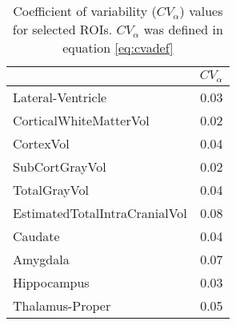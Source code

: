 \begin{table}
[]
\centering
\begin{tabular}{lr}
\toprule
{} &   $CV_{\alpha}$ \\
\midrule
Lateral-Ventricle             &  0.03 \\
CorticalWhiteMatterVol        &  0.02 \\
CortexVol                     &  0.04 \\
SubCortGrayVol                &  0.02 \\
TotalGrayVol                  &  0.04 \\
EstimatedTotalIntraCranialVol &  0.08 \\
Caudate                       &  0.04 \\
Amygdala                      &  0.07 \\
Hippocampus                   &  0.03 \\
Thalamus-Proper               &  0.05 \\
\bottomrule
\end{tabular}
\caption{Coefficient of variability ($CV_{\alpha}$) values for selected ROIs. $CV_{\alpha}$ was defined in equation \ref{eq:cvadef}}
\label{tab:cva} 
\end{table}